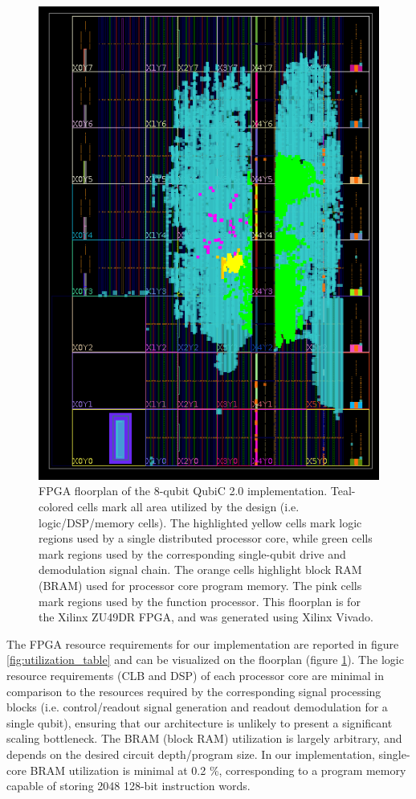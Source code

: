 \documentclass[journal]{IEEEtran}
\begin{document}
\begin{figure}
    \centering
    \includegraphics[scale=0.57, trim={34 0 15 0}, clip]{figures/resource_util_withmem.png}
    \caption{FPGA floorplan of the 8-qubit QubiC 2.0 implementation. Teal-colored cells mark all area utilized by the design (i.e. logic/DSP/memory cells). The highlighted yellow cells mark logic regions used by a single distributed processor core, while green cells mark regions used by the corresponding single-qubit drive and demodulation signal chain. The orange cells highlight block RAM (BRAM) used for processor core program memory. The pink cells mark regions used by the function processor. This floorplan is for the Xilinx ZU49DR FPGA, and was generated using Xilinx Vivado.}
    \label{fig:floorplan}
\end{figure}

The FPGA resource requirements for our implementation are reported in figure \ref{fig:utilization_table} and can be visualized on the floorplan (figure \ref{fig:floorplan}). The logic resource requirements (CLB and DSP) of each processor core are minimal in comparison to the resources required by the corresponding signal processing blocks (i.e. control/readout signal generation and readout demodulation for a single qubit), ensuring that our architecture is unlikely to present a significant scaling bottleneck. The BRAM (block RAM) utilization is largely arbitrary, and depends on the desired circuit depth/program size. In our implementation, single-core BRAM utilization is minimal at 0.2 \%, corresponding to a program memory capable of storing 2048 128-bit instruction words.
\end{document}
